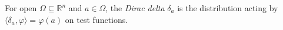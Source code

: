 
For open $\Omega\subseteq\mathbb R^n$ and $a\in\Omega$, the \emph{Dirac delta} $\delta_a$ is the distribution acting by $\langle\delta_a,\varphi\rangle=\varphi(a)$ on test functions.
